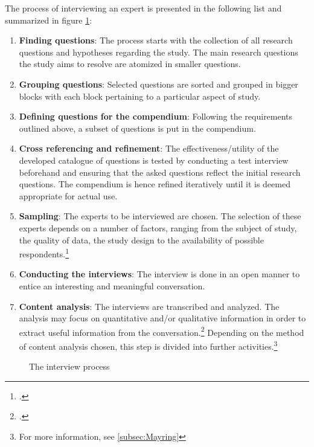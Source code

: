 The process of interviewing an expert is presented in the following list and summarized in figure \ref{fig:InterviewProcess}:
\begin{enumerate}
    \item \textbf{Finding questions}: The process starts with the collection of all research questions and hypotheses regarding the study. The main research questions the study aims to resolve are atomized in smaller questions.
    \item \textbf{Grouping questions}: Selected questions are sorted and grouped in bigger blocks with each block pertaining to a particular aspect of study.
    \item \textbf{Defining questions for the compendium}: Following the requirements outlined above, a subset of questions is put in the compendium.
    \item \textbf{Cross referencing and refinement}: The effectiveness/utility of the developed catalogue of questions is tested by conducting a test interview beforehand and ensuring that the asked questions reflect the initial research questions. The compendium is hence refined iteratively until it is deemed appropriate for actual use.
    \item \textbf{Sampling}: The experts to be interviewed are chosen. The selection of these experts depends on a number of factors, ranging from the subject of study, the quality of data, the study design to the availability of possible respondents.\footcites[Cf.][p.134]{KrugerqualitativeInhaltsanalyseMethode2004}[cf.][p.1 et seq.]{MorseDeterminingsamplesize2000}[cf.][p.137]{Flickintroductionqualitativeresearch2009}
    \item \textbf{Conducting the interviews}: The interview is done in an open manner to entice an interesting and meaningful conversation.
    \item \textbf{Content analysis}: The interviews are transcribed and analyzed. The analysis may focus on quantitative and/or qualitative information in order to extract useful information from the conversation.\footcites[Cf.][p.37 et seqq]{BognerInterviewsmitExperten2014}[cf.][p.454 et seqq]{MeuserExperteninterviewkonzeptionelleGrundlagen2009}[cf.][p.72]{MasonQualitativeresearching2002} Depending on the method of content analysis chosen, this step is divided into further activities.\footnote{For more information, see \ref{subsec:Mayring}}
\end{enumerate}

\begin{figure}
    \centering
    
    \caption[The interview process]{The interview process}
    \label{fig:InterviewProcess}
\end{figure}

